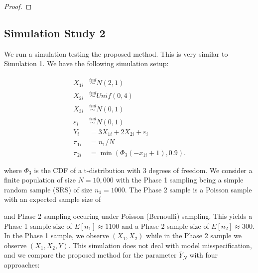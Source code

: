 \documentclass[12pt]{article}
\begin{document}
\begin{proof}
\end{proof}

\subsection{Simulation Study 2}

We run a simulation testing the proposed method. This is very similar to
Simulation 1. We have the following simulation setup:

$$
\begin{aligned}
X_{1i} &\stackrel{ind}{\sim} N(2, 1) \\
X_{2i} &\stackrel{ind}{\sim} Unif(0, 4) \\
X_{3i} &\stackrel{ind}{\sim} N(0, 1) \\
\varepsilon_i &\stackrel{ind}{\sim} N(0, 1) \\
Y_{i} &= 3 X_{1i} + 2 X_{2i} + \varepsilon_i \\
\pi_{1i} &= n_1 / N \\
\pi_{2i} &= \min(\Phi_3(-x_{1i} + 1), 0.9).
\end{aligned}
$$

where $\Phi_3$ is the CDF of a t-distribution with 3 degrees of freedom.
We consider a finite population of size $N = 10,000$ with the Phase 1 
sampling being a simple random sample (SRS) of size $n_1 = 1000$. The Phase 2
sample is a Poisson sample with an expected sample size of 

and
Phase 2 sampling occuring under Poisson (Bernoulli) sampling. This yields a
Phase 1 sample
size of $E[n_1] \approx 1100$ and a Phase 2 sample size of
$E[n_2] \approx 300$. In the Phase 1 sample, we observe 
$(X_1, X_2)$ while in the Phase 2 sample we observe $(X_1, X_2, Y)$. This
simulation does not deal with model misspecification, and we compare the
proposed method for the parameter $\bar Y_N$ with four approaches:
\end{document}
